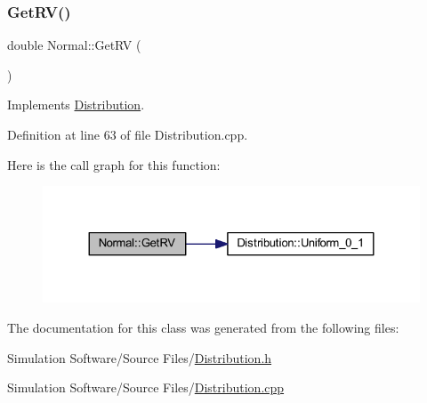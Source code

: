\subsubsection{\texorpdfstring{Get\+R\+V()}{GetRV()}}
{\footnotesize\ttfamily double Normal\+::\+Get\+RV (\begin{DoxyParamCaption}{ }\end{DoxyParamCaption})\hspace{0.3cm}{\ttfamily [virtual]}}



Implements \hyperlink{class_distribution_a63b433850d7b47d84eb69448f7916719}{Distribution}.



Definition at line 63 of file Distribution.\+cpp.

Here is the call graph for this function\+:\nopagebreak
\begin{figure}[H]
\begin{center}
\leavevmode
\includegraphics[width=324pt]{class_normal_a6101d2303601a4f7dfa33fe4b104df7e_cgraph}
\end{center}
\end{figure}


The documentation for this class was generated from the following files\+:\begin{DoxyCompactItemize}
\item 
Simulation Software/\+Source Files/\hyperlink{_distribution_8h}{Distribution.\+h}\item 
Simulation Software/\+Source Files/\hyperlink{_distribution_8cpp}{Distribution.\+cpp}\end{DoxyCompactItemize}
